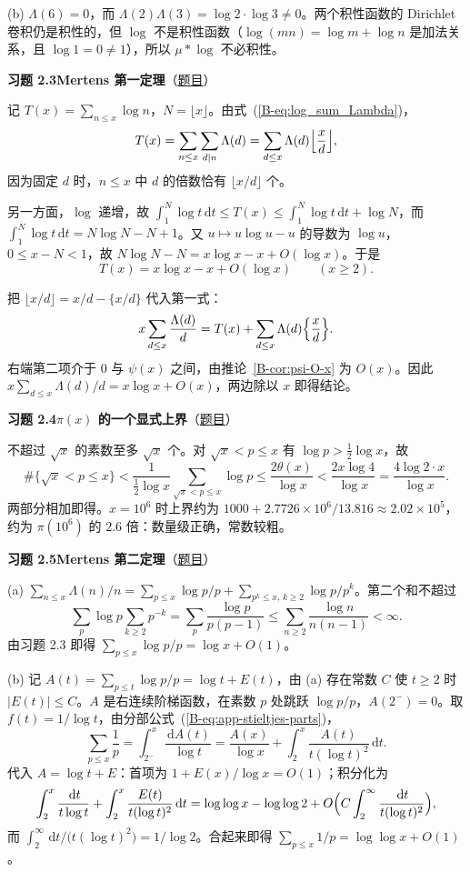 \documentclass[11pt,a4paper]{article}
\newcommand{\dd}{\,\mathrm{d}}
\newcommand{\bref}[1]{\ref*{B-#1}}
\newcommand{\Sol}[2]{%
  \par\addvspace{1.2em}\noindent
  \hypertarget{s:#1}{}\textbf{习题 #1\quad #2}\hfill{\small（\hyperlink{q:#1}{题目}）}\par
  \nopagebreak\smallskip}
\begin{document}
(b) $\Lambda(6)=0$，而 $\Lambda(2)\Lambda(3)=\log2\cdot\log3\ne0$。两个积性函数的 Dirichlet 卷积仍是积性的，但 $\log$ 不是积性函数（$\log(mn)=\log m+\log n$ 是加法关系，且 $\log1=0\ne1$），所以 $\mu*\log$ 不必积性。

\Sol{2.3}{Mertens 第一定理}
记 $T(x)=\sum_{n\le x}\log n$，$N=\lfloor x\rfloor$。由式~(\bref{eq:log_sum_Lambda})，
\[
  T(x)=\sum_{n\le x}\sum_{d\mid n}\Lambda(d)=\sum_{d\le x}\Lambda(d)\Bigl\lfloor\frac xd\Bigr\rfloor ,
\]
因为固定 $d$ 时，$n\le x$ 中 $d$ 的倍数恰有 $\lfloor x/d\rfloor$ 个。

另一方面，$\log$ 递增，故 $\int_1^N\log t\dd t\le T(x)\le\int_1^N\log t\dd t+\log N$，而 $\int_1^N\log t\dd t=N\log N-N+1$。又 $u\mapsto u\log u-u$ 的导数为 $\log u$，$0\le x-N<1$，故 $N\log N-N=x\log x-x+O(\log x)$。于是
\[
  T(x)=x\log x-x+O(\log x)\qquad(x\ge2).
\]

把 $\lfloor x/d\rfloor=x/d-\{x/d\}$ 代入第一式：
\[
  x\sum_{d\le x}\frac{\Lambda(d)}d=T(x)+\sum_{d\le x}\Lambda(d)\Bigl\{\frac xd\Bigr\}.
\]
右端第二项介于 $0$ 与 $\psi(x)$ 之间，由推论~\bref{cor:psi-O-x} 为 $O(x)$。因此
$x\sum_{d\le x}\Lambda(d)/d=x\log x+O(x)$，两边除以 $x$ 即得结论。

\Sol{2.4}{$\pi(x)$ 的一个显式上界}
不超过 $\sqrt x$ 的素数至多 $\sqrt x$ 个。对 $\sqrt x<p\le x$ 有 $\log p>\tfrac12\log x$，故
\[
  \#\{\sqrt x<p\le x\}<\frac{1}{\tfrac12\log x}\sum_{\sqrt x<p\le x}\log p\le\frac{2\theta(x)}{\log x}<\frac{2x\log4}{\log x}=\frac{4\log2\cdot x}{\log x}.
\]
两部分相加即得。$x=10^6$ 时上界约为 $1000+2.7726\times10^6/13.816\approx2.02\times10^5$，约为 $\pi(10^6)$ 的 $2.6$ 倍：数量级正确，常数较粗。

\Sol{2.5}{Mertens 第二定理}
(a) $\sum_{n\le x}\Lambda(n)/n=\sum_{p\le x}\log p/p+\sum_{p^k\le x,\,k\ge2}\log p/p^k$。第二个和不超过
\[
  \sum_p\log p\sum_{k\ge2}p^{-k}=\sum_p\frac{\log p}{p(p-1)}\le\sum_{n\ge2}\frac{\log n}{n(n-1)}<\infty .
\]
由习题 2.3 即得 $\sum_{p\le x}\log p/p=\log x+O(1)$。

(b) 记 $A(t)=\sum_{p\le t}\log p/p=\log t+E(t)$，由 (a) 存在常数 $C$ 使 $t\ge2$ 时 $|E(t)|\le C$。$A$ 是右连续阶梯函数，在素数 $p$ 处跳跃 $\log p/p$，$A(2^-)=0$。取 $f(t)=1/\log t$，由分部公式~(\bref{eq:app-stieltjes-parts})，
\[
  \sum_{p\le x}\frac1p=\int_{2^-}^x\frac{\dd A(t)}{\log t}=\frac{A(x)}{\log x}+\int_2^x\frac{A(t)}{t(\log t)^2}\dd t .
\]
代入 $A=\log t+E$：首项为 $1+E(x)/\log x=O(1)$；积分化为
\[
  \int_2^x\frac{\dd t}{t\log t}+\int_2^x\frac{E(t)}{t(\log t)^2}\dd t=\log\log x-\log\log2+O\Bigl(C\int_2^\infty\frac{\dd t}{t(\log t)^2}\Bigr),
\]
而 $\int_2^\infty\dd t/\bigl(t(\log t)^2\bigr)=1/\log2$。合起来即得 $\sum_{p\le x}1/p=\log\log x+O(1)$。
\end{document}
